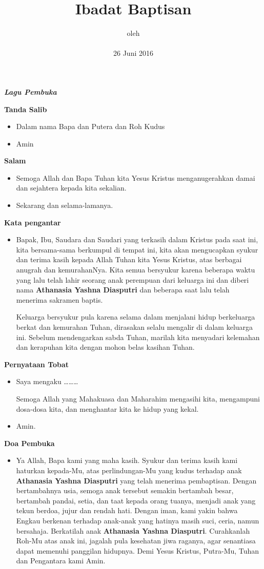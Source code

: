 \documentclass[titlepage,10pt,openany]{scrbook}
\title{Ibadat Baptisan}
\author{\namaaanak}
\date{oleh \\  \namaromo\\26 Juni 2016}
\makeatletter
\newcommand{\subjudul}[1]{%
  {\parindent \z@ 
    \interlinepenalty\@M \bfseries #1\par\nobreak \vskip 10\p@ }}
\newcommand{\lagu}[1]{%
  {\parindent \z@ 
    \interlinepenalty\@M \slshape \bfseries \normalsize \textit{#1}\par\nobreak \vskip 10\p@ }}
\newcommand{\BU}[1]{\begin{itemize} \item[U:] #1 \end{itemize}}
\newcommand{\BP}[1]{\begin{itemize} \item[P:] #1 \end{itemize}}
\newcommand{\namaanak}{Athanasia Yashna Diasputri}
\makeatother
\begin{document}
\thispagestyle{empty}

%

\lagu{Lagu Pembuka}  
 

\subjudul{Tanda Salib} 

\BP{Dalam nama  Bapa dan Putera dan Roh Kudus}

\BU{Amin}

 

\subjudul{Salam}
\BP{Semoga Allah dan Bapa Tuhan kita Yesus Kristus menganugerahkan damai dan 
sejahtera kepada kita sekalian.}
\BU{Sekarang dan selama-lamanya.}

\subjudul{Kata pengantar}
 \BP{Bapak, Ibu, Saudara dan Saudari yang terkasih dalam Kristus pada saat ini, kita bersama-sama berkumpul di tempat ini, kita akan mengucapkan syukur dan terima kasih kepada Allah Tuhan kita Yesus Kristus, atas berbagai anugrah dan kemurahanNya. Kita semua bersyukur karena beberapa waktu yang lalu telah lahir seorang anak perempuan dari keluarga ini dan diberi nama \textbf{\namaanak{}} dan beberapa saat lalu telah menerima sakramen baptis. 
 
 Keluarga bersyukur pula karena selama dalam menjalani hidup berkeluarga berkat dan kemurahan Tuhan, dirasakan selalu mengalir di dalam keluarga ini. Sebelum mendengarkan sabda Tuhan, marilah kita menyadari kelemahan dan kerapuhan kita dengan mohon belas kasihan Tuhan.} 

\subjudul{Pernyataan Tobat}
\BP{Saya mengaku \ldots\ldots\ldots

Semoga Allah yang Mahakuasa dan Maharahim mengasihi kita, mengampuni dosa-dosa kita, dan menghantar kita ke hidup yang kekal.}

\BU{Amin.}


\subjudul{Doa Pembuka}
\BP{Ya Allah, Bapa kami yang maha kasih.
Syukur dan terima kasih kami haturkan kepada-Mu, atas perlindungan-Mu yang kudus terhadap anak \textbf{\namaanak{}} yang telah menerima pembaptisan. Dengan bertambahnya usia, semoga anak tersebut semakin bertambah besar, bertambah pandai, setia, dan taat kepada orang tuanya, menjadi anak yang tekun berdoa, jujur dan rendah hati. Dengan iman, kami yakin bahwa Engkau berkenan terhadap anak-anak yang hatinya masih suci, ceria, namun bersahaja. 
Berkatilah anak \textbf{\namaanak{}}. Curahkanlah Roh-Mu atas anak ini, jagalah pula kesehatan jiwa raganya, agar senantiasa dapat memenuhi panggilan hidupnya. Demi Yesus Kristus, Putra-Mu, Tuhan dan Pengantara kami 
Amin.}
\end{document}
